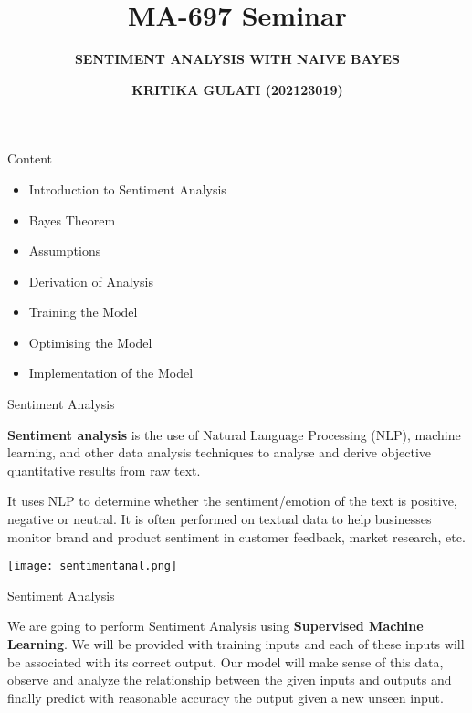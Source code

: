 \documentclass[usenames,dvipsnames]{beamer}
\begin{document}
	\title{\textbf{MA-697 Seminar}}
	\subtitle{\textbf{SENTIMENT ANALYSIS WITH NAIVE BAYES}}
	\author{\textbf{KRITIKA GULATI (202123019)}}
	\begin{frame}
		\titlepage
	\end{frame}
\begin{frame}{Content}
	\begin{itemize}
		\item Introduction to Sentiment Analysis
		\item Bayes Theorem
		\item Assumptions
		\item Derivation of Analysis
		\item Training the Model
		\item Optimising the Model
		\item Implementation of the Model
	\end{itemize}
\end{frame}
\begin{frame}{Sentiment Analysis}
	\begin{block}{}
		\textbf{Sentiment analysis} is the use of Natural Language Processing (NLP), machine learning, and other data analysis techniques to analyse and derive objective quantitative results from raw text.
	\end{block}
\begin{block}{}
	It uses NLP to determine whether the sentiment/emotion of the text is positive, negative or neutral. It is often performed on textual data to help businesses monitor brand and product sentiment in customer feedback,  market research, etc.
\end{block}
\begin{center}
	\texttt{[image: sentimentanal.png]}
\end{center}
\end{frame}
\begin{frame}{Sentiment Analysis}
	\begin{block}{}
	We are going to perform Sentiment Analysis using\textbf{ Supervised Machine Learning}. We will be provided with training inputs and each of these inputs will be associated with its correct output. Our model will make sense of this data, observe and analyze the relationship between the given inputs and outputs and finally predict with reasonable accuracy the output given a new unseen input.
	\end{block}
\end{frame}
\end{document}

